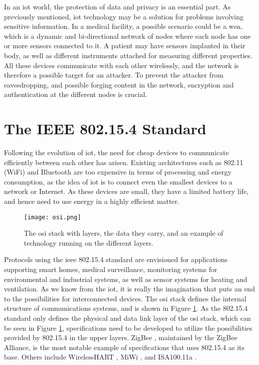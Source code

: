 In an \gls{iot} world, the protection of data and privacy is an essential part. As previously mentioned, \gls{iot} technology may be a solution for problems involving sensitive information. In a medical facility, a possible scenario could be a \gls{wsn}, which is a dynamic and bi-directional network of nodes where each node has one or more sensors connected to it. A patient may have sensors implanted in their body, as well as different instruments attached for measuring different properties. All these devices communicate with each other wirelessly, and the network is therefore a possible target for an attacker. To prevent the attacker from eavesdropping, and possible forging content in the network, encryption and authentication at the different nodes is crucial.








\section{The IEEE 802.15.4 Standard}
\label{sec:802154}

Following the evolution of \gls{iot}, the need for cheap devices to communicate efficiently between each other has arisen. Existing architectures such as 802.11 (WiFi) and Bluetooth are too expensive in terms of processing and energy consumption, as the idea of \gls{iot} is to connect even the smallest devices to a network or Internet. As these devices are small, they have a limited battery life, and hence need to use energy in a highly efficient matter.

\begin{figure}[h]
	\centering
	\texttt{[image: osi.png]}
	\caption{The \gls{osi} stack with layers, the data they carry, and an example of technology running on the different layers.}
	\label{fig:osi}
\end{figure}

Protocols using the \gls{ieee} 802.15.4 standard are envisioned for applications supporting smart homes, medical surveillance, monitoring systems for environmental and industrial systems, as well as sensor systems for heating and ventilation. As we know from the \gls{iot}, it is really the imagination that puts an end to the possibilities for interconnected devices. The \gls{osi} stack defines the internal structure of communications systems, and is shown in Figure \ref{fig:osi}. As the 802.15.4 standard only defines the physical and data link layer of the \gls{osi} stack, which can be seen in Figure \ref{fig:osi}, specifications need to be developed to utilize the possibilities provided by 802.15.4 in the upper layers. ZigBee \cite{zigbee}, maintained by the ZigBee Alliance, is the most notable example of specifications that uses 802.15.4 as its base. Others include WirelessHART \cite{wirelesshart}, MiWi \cite{miwi}, and ISA100.11a \cite{isa100}.

